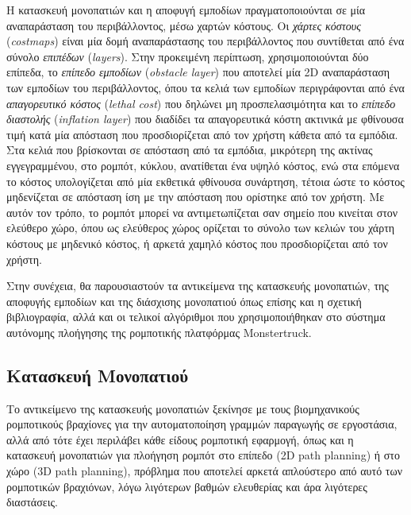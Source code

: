 \bigskip
Η κατασκευή μονοπατιών και η αποφυγή εμποδίων πραγματοποιούνται σε μία αναπαράσταση του περιβάλλοντος, μέσω χαρτών κόστους. Οι \textit{χάρτες κόστους} (\textit{costmaps}) είναι μία δομή αναπαράστασης του περιβάλλοντος που συντίθεται από ένα σύνολο \textit{επιπέδων} (\textit{layers}). Στην προκειμένη περίπτωση, χρησιμοποιούνται δύο επίπεδα, το \textit{επίπεδο εμποδίων} (\textit{obstacle layer}) που αποτελεί μία 2D αναπαράσταση των εμποδίων του περιβάλλοντος, όπου τα κελιά των εμποδίων περιγράφονται από ένα \textit{απαγορευτικό κόστος} (\textit{lethal cost}) που δηλώνει μη προσπελασιμότητα και το \textit{επίπεδο διαστολής} (\textit{inflation layer}) που διαδίδει τα απαγορευτικά κόστη ακτινικά με φθίνουσα τιμή κατά μία απόσταση που προσδιορίζεται από τον χρήστη κάθετα από τα εμπόδια. Στα κελιά που βρίσκονται σε απόσταση από τα εμπόδια, μικρότερη της ακτίνας εγγεγραμμένου, στο ρομπότ, κύκλου, ανατίθεται ένα υψηλό κόστος, ενώ στα επόμενα το κόστος υπολογίζεται από μία εκθετικά φθίνουσα συνάρτηση, τέτοια ώστε το κόστος μηδενίζεται σε απόσταση ίση με την απόσταση που ορίστηκε από τον χρήστη. Με αυτόν τον τρόπο, το ρομπότ μπορεί να αντιμετωπίζεται σαν σημείο που κινείται στον ελεύθερο χώρο, όπου ως ελεύθερος χώρος ορίζεται το σύνολο των κελιών του χάρτη κόστους με μηδενικό κόστος, ή αρκετά χαμηλό κόστος που προσδιορίζεται από τον χρήστη.

\bigskip
Στην συνέχεια, θα παρουσιαστούν τα αντικείμενα της κατασκευής μονοπατιών, της αποφυγής εμποδίων και της διάσχισης μονοπατιού όπως επίσης και η σχετική βιβλιογραφία, αλλά και οι τελικοί αλγόριθμοι που χρησιμοποιήθηκαν στο σύστημα αυτόνομης πλοήγησης της ρομποτικής πλατφόρμας Monstertruck.

\subsection{Κατασκευή Μονοπατιού} \label{ssec:path_planning}
Το αντικείμενο της κατασκευής μονοπατιών ξεκίνησε με τους βιομηχανικούς ρομποτικούς βραχίονες για την αυτοματοποίηση γραμμών παραγωγής σε εργοστάσια, αλλά από τότε έχει περιλάβει κάθε είδους ρομποτική εφαρμογή, όπως και η κατασκευή μονοπατιών για πλοήγηση ρομπότ στο επίπεδο (2D path planning) ή στο χώρο (3D path planning), πρόβλημα που αποτελεί αρκετά απλούστερο από αυτό των ρομποτικών βραχιόνων, λόγω λιγότερων βαθμών ελευθερίας και άρα λιγότερες διαστάσεις.

